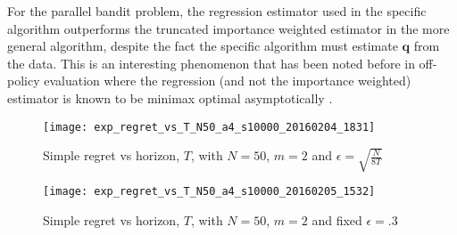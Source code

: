 For the parallel bandit problem, the regression estimator used in the specific algorithm outperforms the truncated importance weighted estimator in the more general algorithm, despite the fact the specific algorithm must estimate $\boldsymbol{q}$ from the data. 
This is an interesting phenomenon that has been noted before in off-policy evaluation where the regression (and not the importance weighted) estimator is known to be minimax optimal asymptotically \citep{LMS14}.

\begin{figure}
\centering
\texttt{[image: exp\_regret\_vs\_T\_N50\_a4\_s10000\_20160204\_1831]}
\caption{Simple regret vs horizon, $T$, with $N = 50$, $m=2$ and $\epsilon = \sqrt{\frac{N}{8T}}$}
\label{fig:simple_vs_T_vary_epsilon}
\end{figure}

\begin{figure}
\centering
\texttt{[image: exp\_regret\_vs\_T\_N50\_a4\_s10000\_20160205\_1532]}
\caption{Simple regret vs horizon, $T$, with $N = 50$, $m=2$ and fixed $\epsilon = .3$}
\label{fig:simple_vs_T}
\end{figure}